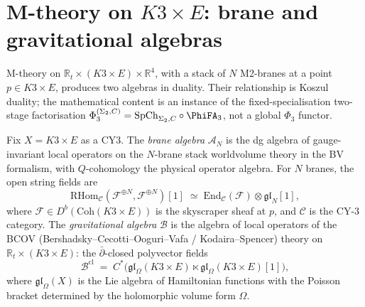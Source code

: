 \section{M-theory on \texorpdfstring{$K3 \times E$}{K3 x E}: brane and gravitational algebras}
\label{sec:phys-mth-k3xe}

M-theory on $\mathbb{R}_t \times (K3 \times E) \times \mathbb{R}^4$, with a stack of $N$ M2-branes at a point $p \in K3 \times E$, produces two algebras in duality. Their relationship is Koszul duality; the mathematical content is an instance of the fixed-specialisation two-stage factorisation $\Phi_3^{(\Sigma_2,C)} = \mathrm{SpCh}_{\Sigma_2, C} \circ \PhiFA_3$, not a global $\Phi_3$ functor.

\begin{definition}
\label{def:phys-mth-brane-grav}
Fix $X = K3 \times E$ as a CY3. The \emph{brane algebra} $\mathcal{A}_N$ is the dg algebra of gauge-invariant local operators on the $N$-brane stack worldvolume theory in the BV formalism, with $Q$-cohomology the physical operator algebra. For $N$ branes, the open string fields are
\[
\mathrm{RHom}_{\mathcal{C}}(\mathcal{F}^{\oplus N}, \mathcal{F}^{\oplus N})[1]
\;\simeq\;
\mathrm{End}_{\mathcal{C}}(\mathcal{F}) \otimes \mathfrak{gl}_N[1],
\]
where $\mathcal{F} \in D^b(\mathrm{Coh}(K3 \times E))$ is the skyscraper sheaf at $p$, and $\mathcal{C}$ is the CY-3 category. The \emph{gravitational algebra} $\mathcal{B}$ is the algebra of local operators of the BCOV (Bershadsky--Cecotti--Ooguri--Vafa / Kodaira--Spencer) theory on $\mathbb{R}_t \times (K3 \times E)$: the $\bar{\partial}$-closed polyvector fields
\[
\mathcal{B}^{\mathrm{cl}} \;=\; C^*\!\bigl(\mathfrak{gl}_\Omega(K3 \times E) \ltimes \mathfrak{gl}_\Omega(K3 \times E)[1]\bigr),
\]
where $\mathfrak{gl}_\Omega(X)$ is the Lie algebra of Hamiltonian functions with the Poisson bracket determined by the holomorphic volume form $\Omega$.
\end{definition}

